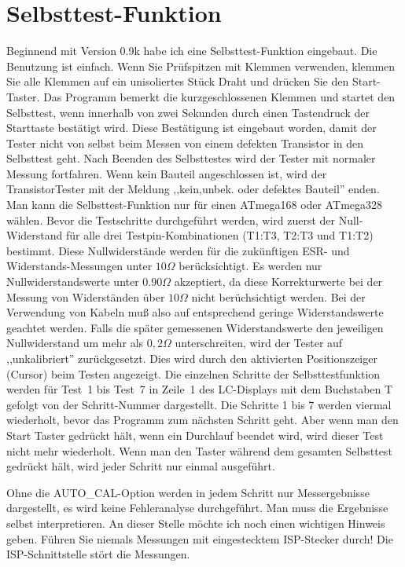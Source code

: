 
\section{Selbsttest-Funktion}
\label{sec:selftest}
Beginnend mit Version 0.9k habe ich eine Selbsttest-Funktion eingebaut.
Die Benutzung ist einfach.
Wenn Sie Prüfspitzen mit Klemmen verwenden, klemmen Sie alle Klemmen auf ein unisoliertes Stück Draht und drücken Sie
den Start-Taster.
Das Programm bemerkt die kurzgeschlossenen Klemmen und startet den Selbsttest, wenn innerhalb von
zwei Sekunden durch einen Tastendruck der Starttaste bestätigt wird. Diese Bestätigung ist eingebaut
worden, damit der Tester nicht von selbst beim Messen von einem defekten Transistor in den Selbsttest geht.
Nach Beenden des Selbsttestes wird der Tester mit normaler Messung fortfahren.
Wenn kein Bauteil angeschlossen ist, wird der TransistorTester mit der
Meldung ,,kein,unbek. oder defektes Bauteil'' enden.
Man kann die Selbsttest-Funktion nur für einen ATmega168 oder ATmega328 wählen.
Bevor die Testschritte durchgeführt werden, wird zuerst der Null-Widerstand für alle drei Testpin-Kombinationen
(T1:T3, T2:T3 und T1:T2) bestimmt. Diese Nullwiderstände werden für die zukünftigen ESR- und Widerstands-Messungen
unter \(10\Omega\) berücksichtigt. 
Es werden nur Nullwiderstandswerte unter \(0.90\Omega\) akzeptiert, da diese Korrekturwerte bei der Messung 
von Widerständen über \(10\Omega\) nicht berüchsichtigt werden.
Bei der Verwendung von Kabeln muß also auf entsprechend
geringe Widerstandswerte geachtet werden.
Falls die später gemessenen Widerstandswerte den jeweiligen Nullwiderstand um mehr als \(0,2\Omega\) unterschreiten,
wird der Tester auf ,,unkalibriert'' zurückgesetzt. 
Dies wird durch den aktivierten Positionszeiger (Cursor)  beim Testen angezeigt.
Die einzelnen Schritte der Selbsttestfunktion werden für Test~1 bis Test~7 in Zeile~1 des LC-Displays mit dem Buchstaben T
gefolgt von der Schritt-Nummer dargestellt.
Die Schritte 1 bis 7 werden viermal wiederholt, bevor das Programm zum nächsten Schritt geht.
Aber wenn man den Start Taster gedrückt hält, wenn ein Durchlauf beendet wird, wird dieser Test nicht
mehr wiederholt.
Wenn man den Taster während dem gesamten Selbsttest gedrückt hält, wird jeder Schritt nur einmal ausgeführt.

Ohne die AUTO\_CAL-Option werden in jedem Schritt nur Messergebnisse dargestellt, es wird keine Fehleranalyse durchgeführt.
Man  muss die Ergebnisse selbst interpretieren.
An dieser Stelle möchte ich noch einen wichtigen Hinweis geben. Führen Sie niemals Messungen mit
eingestecktem ISP-Stecker durch!
Die ISP-Schnittstelle stört die Messungen.

